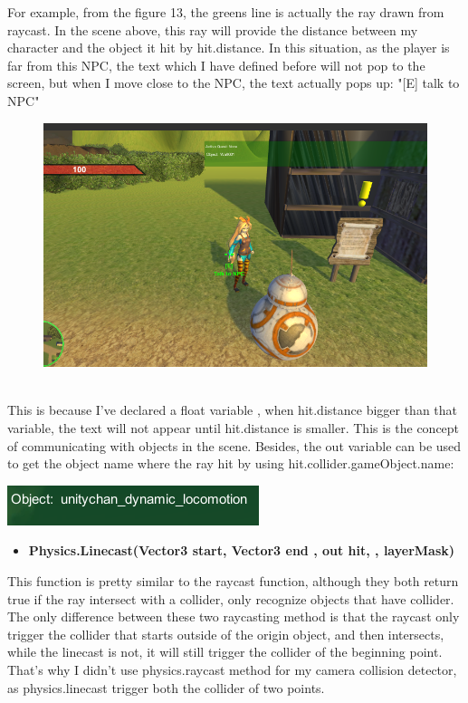 \documentclass[a4paper, 13pt]{extarticle}
\begin{document}
 	For example, from the figure 13, the greens line is actually the ray drawn from raycast. In the scene above, this ray will provide the distance between my character and the object it hit by hit.distance. In this situation, as the player is far from this NPC, the text which I have defined before will not pop to the screen, but when I move close to the NPC, the text actually pops up: "[E] talk to NPC"
 	\begin{figure}[h]
 		
 			\begin{minipage}{1\textwidth}
 				\centering
 				\includegraphics[width=0.5\linewidth]{intructions/text_popup.png}
 				\centering
 				\label{fig:test15}
 			\end{minipage}
 		\end{figure}
 	\\[0.05cm]
 	This is because I've declared a float variable , when hit.distance bigger than that variable, the text will not appear until hit.distance is smaller. This is the concept of communicating with objects in the scene. Besides, the out variable can be used to get the object name where the ray hit by using hit.collider.gameObject.name: 	
 	\noindent\begin{minipage}{0.3\textwidth}
 		\includegraphics[width=\linewidth]{intructions/objectname.png}
 	\end{minipage}
 	\begin{itemize}
 		\item \bfseries Physics.Linecast(Vector3 start,  Vector3 end , out hit, , layerMask)	 	
 	\end{itemize}
 		This function is pretty similar to the raycast function, although they both return true if the ray intersect with a collider, only recognize objects that have collider. The only difference between these two raycasting method is that the raycast only trigger the collider that starts outside of the origin object, and then intersects,  while the linecast is not, it will still trigger the collider of the beginning point. That's why I didn't use physics.raycast method for my camera collision detector, as physics.linecast trigger both the collider of two points.
 
\end{document}
